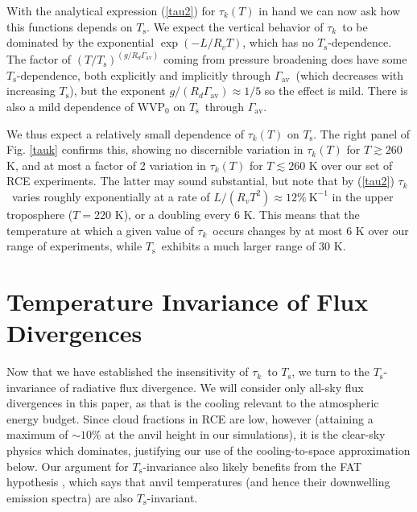 \documentclass[10pt]{article}
\newcommand{\eqnref}[1]{(\ref{#1})}
\newcommand{\tauk}{\ensuremath{\tau_k}}
\newcommand{\Ts}{\ensuremath{T_\mathrm{s}}}
\newcommand{\WVP}{\ensuremath{\mathrm{WVP}}}
\newcommand{\gammaav}{\ensuremath{\Gamma_\mathrm{av}}}
\newcommand{\Kinverse}{\ensuremath{\mathrm{K^{-1}}}}
\begin{document}
With the analytical expression \eqnref{tau2} for $\tauk(T)$ in hand we can now ask how this functions depends on \Ts. We expect the vertical behavior of \tauk\ to be dominated by the exponential $\exp(-L/R_vT)$, which has no \Ts-dependence. The factor of
$(T/\Ts)^{(g/R_d\gammaav)}$ coming from pressure broadening does have some \Ts-dependence, both explicitly and implicitly through \gammaav\ (which decreases with increasing \Ts), but the exponent $g/(R_d \gammaav) \approx 1/5$ so the effect is mild. There is also a mild dependence of  $\WVP_0$ on \Ts\ through \gammaav. 

We thus expect a relatively small dependence of $\tauk(T)$ on \Ts. The right panel of Fig. \ref{tauk} confirms this, showing no discernible variation in $\tauk(T)$ for $T \gtrsim 260 $ K, and at most a factor of 2 variation in $\tauk(T)$ for $T \lesssim 260$ K over our set of RCE experiments. The latter may sound substantial, but note that by \eqnref{tau2} \tauk\ varies roughly exponentially at a rate of $L/(R_vT^2) \approx  12\%\ \Kinverse$ in the upper troposphere ($T=220$ K), or a doubling every 6 K. This means that the temperature at which a given value of  \tauk\ occurs changes by at most 6 K over our range of experiments, while \Ts\ exhibits a much larger range of  30 K.


\section{Temperature Invariance of Flux Divergences}
Now that we have established the insensitivity of  \tauk\  to \Ts, we turn to the \Ts-invariance of radiative flux divergence. We will consider only all-sky flux divergences in this paper, as that is the cooling relevant to the atmospheric energy budget. Since cloud fractions in RCE are low, however (attaining a maximum of $\sim 10 \%$ at the anvil height in our simulations), it is the clear-sky physics which dominates, justifying our use of the cooling-to-space approximation below. Our argument for \Ts-invariance also likely benefits from the FAT hypothesis \citep{harrop2012,hartmann2002}, which says that anvil temperatures (and hence their downwelling emission spectra) are also \Ts-invariant. 
\end{document}
